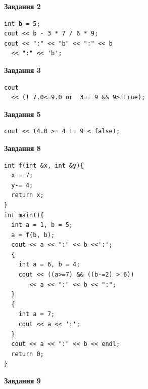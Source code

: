 \documentclass[12pt, ukrainian]{article}
\begin{document}
{\begin {large}
\begin{minipage}[t]{7.0cm}
\end{minipage}
\vline \hspace{1mm}
\begin{minipage}[t]{11.0cm}

\begin{center}
\textbf{Завдання 2}
\end{center}
\vspace{-8mm}

\begin{verbatim}
int b = 5;
cout << b - 3 * 7 / 6 * 9;
cout << ":" << "b" << ":" << b 
  << ":" << 'b';
\end{verbatim}



\begin{center}
\textbf{Завдання 3}
\end{center}
\vspace{-8mm}

\begin{verbatim}
cout 
  << (! 7.0<=9.0 or  3== 9 && 9>=true);
\end{verbatim}



\begin{center}
\textbf{Завдання 5}
\end{center}
\vspace{-8mm}

\begin{verbatim}
cout << (4.0 >= 4 != 9 < false);
\end{verbatim}



\begin{center}
\textbf{Завдання 8}
\end{center}
\vspace{-8mm}

\begin{verbatim}
int f(int &x, int &y){
  x = 7;
  y-= 4;
  return x;
}
int main(){
  int a = 1, b = 5;
  a = f(b, b);
  cout << a << ":" << b <<':';
  {
    int a = 6, b = 4;
    cout << ((a>=7) && ((b-=2) > 6))
       << a << ":" << b << ":";
  }
  {
    int a = 7;
    cout << a << ':';
  }
  cout << a << ":" << b << endl;
  return 0;
}
\end{verbatim}

\end{minipage}


\begin{minipage}[t]{7.0cm}

\begin{center}
\textbf{Завдання 9}
\end{center}
\vspace{-8mm}


\end{minipage}
\end{large}}
\end{document}
